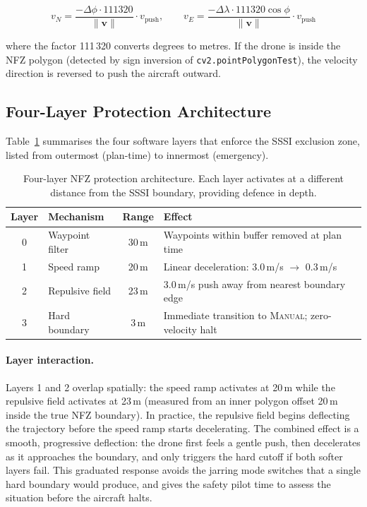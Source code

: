 \begin{equation}\label{eq:push-vel}
  v_N = \frac{-\Delta\phi \cdot 111320}{\|\mathbf{v}\|} \cdot v_{\text{push}}, \qquad
  v_E = \frac{-\Delta\lambda \cdot 111320\cos\phi}{\|\mathbf{v}\|} \cdot v_{\text{push}}
\end{equation}

\noindent where the factor 111\,320 converts degrees to metres. If the drone is inside the NFZ polygon (detected by sign inversion of \texttt{cv2.pointPolygonTest}), the velocity direction is reversed to push the aircraft outward.

\subsection{Four-Layer Protection Architecture}\label{sec:nfz-layers}

Table~\ref{tab:nfz-layers} summarises the four software layers that enforce the SSSI exclusion zone, listed from outermost (plan-time) to innermost (emergency).

\begin{table}[ht]
  \centering\compactTable
  \caption{Four-layer NFZ protection architecture. Each layer activates at a different distance from the SSSI boundary, providing defence in depth.}\label{tab:nfz-layers}
  \begin{tabularx}{\linewidth}{@{}c l c X@{}}
    \toprule
    \textbf{Layer} & \textbf{Mechanism} & \textbf{Range} & \textbf{Effect} \\
    \midrule
    0 & Waypoint filter      & 30\,m & Waypoints within buffer removed at plan time \\
    1 & Speed ramp           & 20\,m & Linear deceleration: 3.0\,m/s $\to$ 0.3\,m/s \\
    2 & Repulsive field      & 23\,m & 3.0\,m/s push away from nearest boundary edge \\
    3 & Hard boundary        &  3\,m & Immediate transition to \textsc{Manual}; zero-velocity halt \\
    \bottomrule
  \end{tabularx}
\end{table}

\paragraph{Layer interaction.}
Layers 1 and 2 overlap spatially: the speed ramp activates at 20\,m while the repulsive field activates at 23\,m (measured from an inner polygon offset 20\,m inside the true NFZ boundary). In practice, the repulsive field begins deflecting the trajectory before the speed ramp starts decelerating. The combined effect is a smooth, progressive deflection: the drone first feels a gentle push, then decelerates as it approaches the boundary, and only triggers the hard cutoff if both softer layers fail. This graduated response avoids the jarring mode switches that a single hard boundary would produce, and gives the safety pilot time to assess the situation before the aircraft halts.


